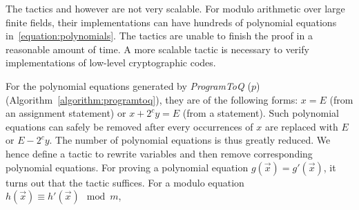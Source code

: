 The tactics  and  however are not very
scalable.  
For modulo arithmetic over large finite fields, their 
implementations can have hundreds of polynomial equations
in~\ref{equation:polynomials}. The \coq tactics are unable to finish
the proof in a reasonable amount of time. A more scalable tactic is
necessary to verify implementations of low-level cryptographic codes.

For the polynomial equations generated by \textit{ProgramToQ}
($p$) (Algorithm~\ref{algorithm:programtoq}), they are of the
following forms: $x = E$ (from an assignment statement) or $x + 2^c y
= E$ (from a  statement). Such polynomial equations can
safely be removed after every occurrences of $x$ are replaced with $E$
or $E - 2^c y$. The number of polynomial equations is thus greatly
reduced. We hence define a \coq tactic to rewrite variables and then
remove corresponding polynomial equations. For proving a polynomial
equation $g (\vec{x}) = g' (\vec{x})$, it turns out that the \coq tactic
 suffices. For a modulo equation $h (\vec{x}) \equiv
h' (\vec{x}) \mod m$, 
